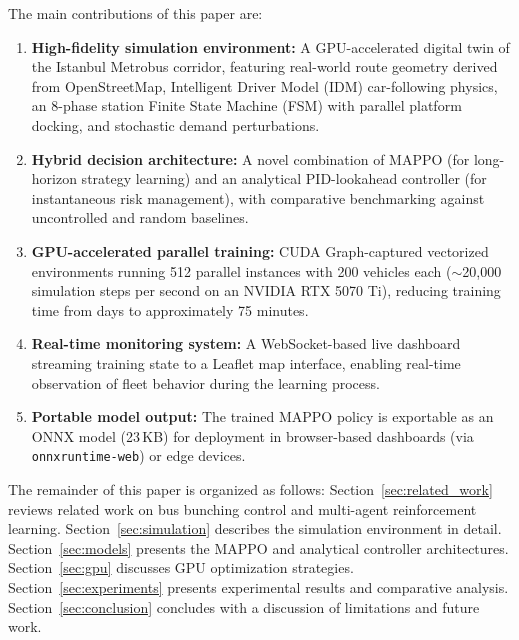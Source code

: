 The main contributions of this paper are:

\begin{enumerate}
    \item \textbf{High-fidelity simulation environment:} A GPU-accelerated digital twin of the Istanbul Metrobus corridor, featuring real-world route geometry derived from OpenStreetMap, Intelligent Driver Model (IDM) car-following physics, an 8-phase station Finite State Machine (FSM) with parallel platform docking, and stochastic demand perturbations.
    
    \item \textbf{Hybrid decision architecture:} A novel combination of MAPPO (for long-horizon strategy learning) and an analytical PID-lookahead controller (for instantaneous risk management), with comparative benchmarking against uncontrolled and random baselines.
    
    \item \textbf{GPU-accelerated parallel training:} CUDA Graph-captured vectorized environments running 512 parallel instances with 200 vehicles each ($\sim$20,000 simulation steps per second on an NVIDIA RTX 5070 Ti), reducing training time from days to approximately 75 minutes.
    
    \item \textbf{Real-time monitoring system:} A WebSocket-based live dashboard streaming training state to a Leaflet map interface, enabling real-time observation of fleet behavior during the learning process.
    
    \item \textbf{Portable model output:} The trained MAPPO policy is exportable as an ONNX model (23\,KB) for deployment in browser-based dashboards (via \texttt{onnxruntime-web}) or edge devices.
\end{enumerate}

The remainder of this paper is organized as follows: Section~\ref{sec:related_work} reviews related work on bus bunching control and multi-agent reinforcement learning. Section~\ref{sec:simulation} describes the simulation environment in detail. Section~\ref{sec:models} presents the MAPPO and analytical controller architectures. Section~\ref{sec:gpu} discusses GPU optimization strategies. Section~\ref{sec:experiments} presents experimental results and comparative analysis. Section~\ref{sec:conclusion} concludes with a discussion of limitations and future work.
